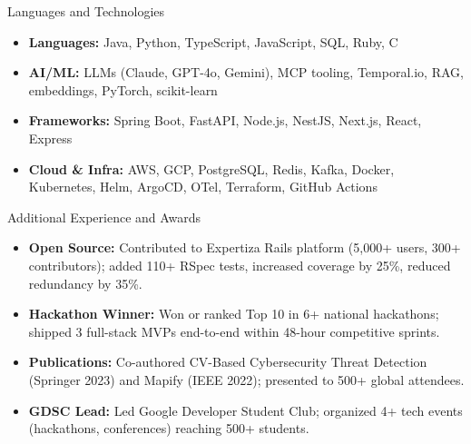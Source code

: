\documentclass[]{mcdowellcv}
\begin{document}
\begin{cvsection}{Languages and Technologies}
  \begin{cvsubsection}{}{}{}
    \begin{itemize}
      \item \textbf{Languages:} Java, Python, TypeScript, JavaScript, SQL, Ruby, C
      \item \textbf{AI/ML:} LLMs (Claude, GPT-4o, Gemini), MCP tooling, Temporal.io, RAG, embeddings, PyTorch, scikit-learn
      \item \textbf{Frameworks:} Spring Boot, FastAPI, Node.js, NestJS, Next.js, React, Express
      \item \textbf{Cloud \& Infra:} AWS, GCP, PostgreSQL, Redis, Kafka, Docker, Kubernetes, Helm, ArgoCD, OTel, Terraform, GitHub Actions
    \end{itemize}
  \end{cvsubsection}
\end{cvsection}

\begin{cvsection}{Additional Experience and Awards}
  \begin{cvsubsection}{}{}{}
    \begin{itemize}
      \item \textbf{Open Source:} Contributed to Expertiza Rails platform (5,000+ users, 300+ contributors); added 110+ RSpec tests, increased coverage by 25\%, reduced redundancy by 35\%.
      \item \textbf{Hackathon Winner:} Won or ranked Top 10 in 6+ national hackathons; shipped 3 full-stack MVPs end-to-end within 48-hour competitive sprints.
      \item \textbf{Publications:} Co-authored CV-Based Cybersecurity Threat Detection (Springer 2023) and Mapify (IEEE 2022); presented to 500+ global attendees.
      \item \textbf{GDSC Lead:} Led Google Developer Student Club; organized 4+ tech events (hackathons, conferences) reaching 500+ students.
    \end{itemize}
  \end{cvsubsection}
\end{cvsection}
\end{document}
